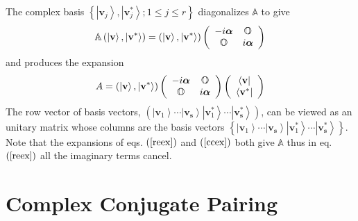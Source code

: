 \documentclass[aps,preprint]{revtex4}%
\begin{document}
The complex basis $\left\{  \left\vert \mathbf{v}_{j}\right\rangle ,\left\vert
\mathbf{v}_{j}^{\ast}\right\rangle ;1\leq j\leq r\right\}  $ diagonalizes
$\mathbb{A}$ to give
\begin{equation}
\mathbb{A}\left(  \left\vert \mathbf{v}\right\rangle ,\left\vert
\mathbf{v}^{\ast}\right\rangle \right)  =\left(  \left\vert \mathbf{v}%
\right\rangle ,\left\vert \mathbf{v}^{\ast}\right\rangle \right)  \left(
\begin{array}
[c]{cc}%
-i\boldsymbol{\alpha} & \mathbb{O}\\
\mathbb{O} & i\boldsymbol{\alpha}
\end{array}
\right)
\end{equation}
and produces the expansion%
\begin{equation}
A=\left(  \left\vert \mathbf{v}\right\rangle ,\left\vert \mathbf{v}^{\ast
}\right\rangle \right)  \left(
\begin{array}
[c]{cc}%
-i\boldsymbol{\alpha} & \mathbb{O}\\
\mathbb{O} & i\boldsymbol{\alpha}
\end{array}
\right)  \left(
\begin{array}
[c]{c}%
\left\langle \mathbf{v}\right\vert \\
\left\langle \mathbf{v}^{\ast}\right\vert
\end{array}
\right)  \label{ccex}%
\end{equation}
The row vector of basis vectors, $\left(  \left\vert \mathbf{v}_{1}%
\right\rangle \cdots\left\vert \mathbf{v}_{\mathbf{s}}\right\rangle \left\vert
\mathbf{v}_{1}^{\ast}\right\rangle \cdots\left\vert \mathbf{v}_{\mathbf{s}%
}^{\ast}\right\rangle \right)  $, can be viewed as an unitary matrix whose
columns are the basis vectors $\left\{  \left\vert \mathbf{v}_{1}\right\rangle
\cdots\left\vert \mathbf{v}_{\mathbf{s}}\right\rangle \left\vert
\mathbf{v}_{1}^{\ast}\right\rangle \cdots\left\vert \mathbf{v}_{\mathbf{s}%
}^{\ast}\right\rangle \right\}  $. Note that the expansions of eqs. $\left(
\ref{reex}\right)  $ and $\left(  \ref{ccex}\right)  $ both give $\mathbb{A}$
thus in eq. $\left(  \ref{reex}\right)  $ all the imaginary terms cancel.

\section{Complex Conjugate Pairing\label{pairing}}
\end{document}
